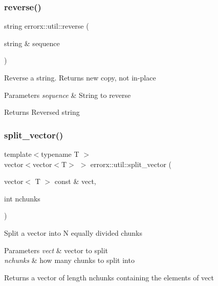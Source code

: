 \subsubsection{\texorpdfstring{reverse()}{reverse()}}
{\footnotesize\ttfamily string errorx\+::util\+::reverse (\begin{DoxyParamCaption}\item[{string \&}]{sequence }\end{DoxyParamCaption})}

Reverse a string. Returns new copy, not in-\/place


\begin{DoxyParams}{Parameters}
{\em sequence} & String to reverse\\
\hline
\end{DoxyParams}
\begin{DoxyReturn}{Returns}
Reversed string 
\end{DoxyReturn}
\mbox{\label{util_8hh_file_a5be6bd3e6a08f8e1aff1263fbee80f9a}} 
\subsubsection{\texorpdfstring{split\+\_\+vector()}{split\_vector()}}
{\footnotesize\ttfamily template$<$typename T $>$ \\
vector$<$vector$<$T$>$ $>$ errorx\+::util\+::split\+\_\+vector (\begin{DoxyParamCaption}\item[{vector$<$ T $>$ const \&}]{vect,  }\item[{int}]{nchunks }\end{DoxyParamCaption})}

Split a vector into N equally divided chunks


\begin{DoxyParams}{Parameters}
{\em vect} & vector to split \\
\hline
{\em nchunks} & how many chunks to split into\\
\hline
\end{DoxyParams}
\begin{DoxyReturn}{Returns}
a vector of length nchunks containing the elements of vect 
\end{DoxyReturn}
\mbox{\label{util_8hh_file_af715e802c3f11065f3f5474652ab472c}} 
